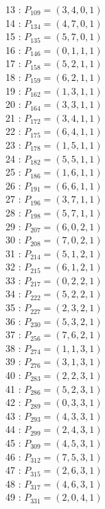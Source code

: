 \documentclass{article}
\begin{document}
{\begin{multicols}{3}
13 : $P_{109}=( 3, 4, 0, 1 )$\\
14 : $P_{134}=( 4, 7, 0, 1 )$\\
15 : $P_{135}=( 5, 7, 0, 1 )$\\
16 : $P_{146}=( 0, 1, 1, 1 )$\\
17 : $P_{158}=( 5, 2, 1, 1 )$\\
18 : $P_{159}=( 6, 2, 1, 1 )$\\
19 : $P_{162}=( 1, 3, 1, 1 )$\\
20 : $P_{164}=( 3, 3, 1, 1 )$\\
21 : $P_{172}=( 3, 4, 1, 1 )$\\
22 : $P_{175}=( 6, 4, 1, 1 )$\\
23 : $P_{178}=( 1, 5, 1, 1 )$\\
24 : $P_{182}=( 5, 5, 1, 1 )$\\
25 : $P_{186}=( 1, 6, 1, 1 )$\\
26 : $P_{191}=( 6, 6, 1, 1 )$\\
27 : $P_{196}=( 3, 7, 1, 1 )$\\
28 : $P_{198}=( 5, 7, 1, 1 )$\\
29 : $P_{207}=( 6, 0, 2, 1 )$\\
30 : $P_{208}=( 7, 0, 2, 1 )$\\
31 : $P_{214}=( 5, 1, 2, 1 )$\\
32 : $P_{215}=( 6, 1, 2, 1 )$\\
33 : $P_{217}=( 0, 2, 2, 1 )$\\
34 : $P_{222}=( 5, 2, 2, 1 )$\\
35 : $P_{227}=( 2, 3, 2, 1 )$\\
36 : $P_{230}=( 5, 3, 2, 1 )$\\
37 : $P_{256}=( 7, 6, 2, 1 )$\\
38 : $P_{274}=( 1, 1, 3, 1 )$\\
39 : $P_{276}=( 3, 1, 3, 1 )$\\
40 : $P_{283}=( 2, 2, 3, 1 )$\\
41 : $P_{286}=( 5, 2, 3, 1 )$\\
42 : $P_{289}=( 0, 3, 3, 1 )$\\
43 : $P_{293}=( 4, 3, 3, 1 )$\\
44 : $P_{299}=( 2, 4, 3, 1 )$\\
45 : $P_{309}=( 4, 5, 3, 1 )$\\
46 : $P_{312}=( 7, 5, 3, 1 )$\\
47 : $P_{315}=( 2, 6, 3, 1 )$\\
48 : $P_{317}=( 4, 6, 3, 1 )$\\
49 : $P_{331}=( 2, 0, 4, 1 )$\\

\end{multicols}}
\end{document}
